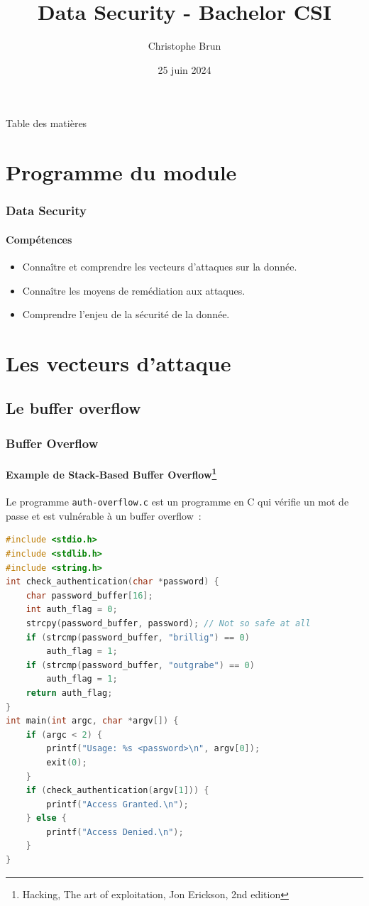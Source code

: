 \documentclass{beamer}
\title{Data Security - Bachelor CSI}
\author{Christophe Brun}
\institute{Campus Saint-Michel IT}
\date{25 juin 2024}
\begin{document}
    \begin{frame}
        \transdissolve
        \titlepage
    \end{frame}

    \begin{frame}{Table des matières}
        \tableofcontents
    \end{frame}


    \section{Programme du module}\label{sec:programme-du-module}
    \begin{frame}
        \frametitle{Data Security}
        \framesubtitle{Compétences}
        \transdissolve
        \begin{itemize}
            \item Connaître et comprendre les vecteurs d'attaques sur la donnée.
            \item Connaître les moyens de remédiation aux attaques.
            \item Comprendre l'enjeu de la sécurité de la donnée.
        \end{itemize}
    \end{frame}


    \section{Les vecteurs d'attaque}\label{sec:les-vecteurs-dattaque}

    \subsection{Le buffer overflow}\label{subsec:les-buffer-overflow}
    \begin{frame}[fragile]
        \frametitle{Buffer Overflow}
        \framesubtitle{Example de Stack-Based Buffer Overflow\footnote{\label{hacking}Hacking, The art of exploitation, Jon Erickson, 2nd edition}}
        \transdissolve
        Le programme \lstinline{auth-overflow.c} est un programme en C qui vérifie un mot de passe et est vulnérable à un buffer overflow~:
        \begin{lstlisting}[language=C,basicstyle=\tiny\ttfamily]
#include <stdio.h>
#include <stdlib.h>
#include <string.h>
int check_authentication(char *password) {
    char password_buffer[16];
    int auth_flag = 0;
    strcpy(password_buffer, password); // Not so safe at all
    if (strcmp(password_buffer, "brillig") == 0)
        auth_flag = 1;
    if (strcmp(password_buffer, "outgrabe") == 0)
        auth_flag = 1;
    return auth_flag;
}
int main(int argc, char *argv[]) {
    if (argc < 2) {
        printf("Usage: %s <password>\n", argv[0]);
        exit(0);
    }
    if (check_authentication(argv[1])) {
        printf("Access Granted.\n");
    } else {
        printf("Access Denied.\n");
    }
}
        \end{lstlisting}
    \end{frame}
\end{document}
